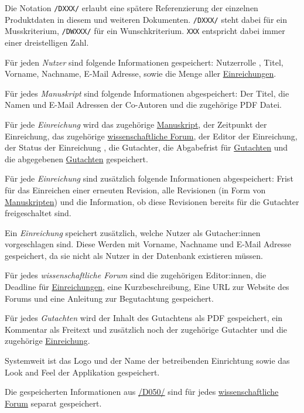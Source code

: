 
Die Notation \texttt{/DXXX/} erlaubt eine spätere Referenzierung der einzelnen Produktdaten in diesem und weiteren
Dokumenten. \texttt{/DXXX/} steht dabei für ein Musskriterium, \texttt{/DWXXX/} für ein Wunschkriterium. \texttt{XXX} entspricht dabei immer einer dreistelligen Zahl.

\begin{description}
	 Für jeden \emph{Nutzer} sind folgende Informationen gespeichert: Nutzerrolle , Titel, Vorname, Nachname, E-Mail Adresse, sowie die Menge aller \hyperref[d025]{Einreichungen}.
	
	 Für jedes \emph{Manuskript} sind folgende Informationen abgespeichert: Der Titel, die Namen und E-Mail Adressen der Co-Autoren und die zugehörige PDF Datei. 
	
	 Für jede \emph{Einreichung} wird das zugehörige \hyperref[d020]{Manuskript}, der Zeitpunkt der Einreichung, das zugehörige \hyperref[d030]{wissenschaftliche Forum}, der Editor  der Einreichung, der Status der Einreichung , die Gutachter, die Abgabefrist für \hyperref[d040]{Gutachten} und die abgegebenen \hyperref[d040]{Gutachten} gespeichert.
	
	 Für jede \emph{Einreichung} sind zusätzlich folgende Informationen abgespeichert: Frist für das Einreichen einer erneuten Revision, alle Revisionen (in Form von \hyperref[d020]{Manuskripten}) und die Information, ob diese Revisionen bereits für die Gutachter freigeschaltet sind.
	
	 Ein \emph{Einreichung} speichert zusätzlich, welche Nutzer als Gutacher:innen vorgeschlagen sind. Diese Werden mit Vorname, Nachname und E-Mail Adresse gespeichert, da sie nicht als Nutzer in der Datenbank existieren müssen.
	
	 Für jedes \emph{wissenschaftliche Forum} sind die zugehörigen Editor:innen, die Deadline für \hyperref[d025]{Einreichungen}, eine Kurzbeschreibung, Eine URL zur Website des Forums und eine Anleitung zur Begutachtung gespeichert.
	
	 Für jedes \emph{Gutachten} wird der Inhalt des Gutachtens als PDF gespeichert, ein Kommentar als Freitext und zusätzlich noch der zugehörige Gutachter  und die zugehörige \hyperref[d025]{Einreichung}.
	
	 Systemweit ist das Logo und der Name der betreibenden Einrichtung sowie das Look and Feel der Applikation gespeichert.
	
	 Die gespeicherten Informationen aus \hyperref[d050]{/D050/} sind für jedes \hyperref[d030]{wissenschaftliche Forum} separat gespeichert.
\end{description}
